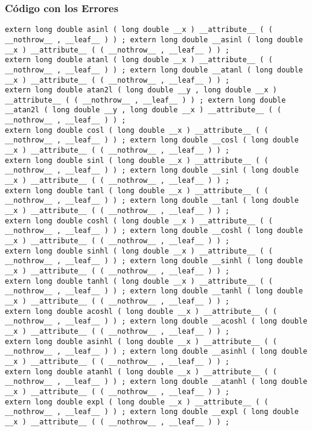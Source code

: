 \documentclass{beamer}
\begin{document}
\begin{frame}[fragile]
\frametitle{C\'odigo con los Errores}
\begin{verbatim}
extern long double asinl ( long double __x ) __attribute__ ( ( __nothrow__ , __leaf__ ) ) ; extern long double __asinl ( long double __x ) __attribute__ ( ( __nothrow__ , __leaf__ ) ) ; 
extern long double atanl ( long double __x ) __attribute__ ( ( __nothrow__ , __leaf__ ) ) ; extern long double __atanl ( long double __x ) __attribute__ ( ( __nothrow__ , __leaf__ ) ) ; 
extern long double atan2l ( long double __y , long double __x ) __attribute__ ( ( __nothrow__ , __leaf__ ) ) ; extern long double __atan2l ( long double __y , long double __x ) __attribute__ ( ( __nothrow__ , __leaf__ ) ) ; 
extern long double cosl ( long double __x ) __attribute__ ( ( __nothrow__ , __leaf__ ) ) ; extern long double __cosl ( long double __x ) __attribute__ ( ( __nothrow__ , __leaf__ ) ) ; 
extern long double sinl ( long double __x ) __attribute__ ( ( __nothrow__ , __leaf__ ) ) ; extern long double __sinl ( long double __x ) __attribute__ ( ( __nothrow__ , __leaf__ ) ) ; 
extern long double tanl ( long double __x ) __attribute__ ( ( __nothrow__ , __leaf__ ) ) ; extern long double __tanl ( long double __x ) __attribute__ ( ( __nothrow__ , __leaf__ ) ) ; 
extern long double coshl ( long double __x ) __attribute__ ( ( __nothrow__ , __leaf__ ) ) ; extern long double __coshl ( long double __x ) __attribute__ ( ( __nothrow__ , __leaf__ ) ) ; 
extern long double sinhl ( long double __x ) __attribute__ ( ( __nothrow__ , __leaf__ ) ) ; extern long double __sinhl ( long double __x ) __attribute__ ( ( __nothrow__ , __leaf__ ) ) ; 
extern long double tanhl ( long double __x ) __attribute__ ( ( __nothrow__ , __leaf__ ) ) ; extern long double __tanhl ( long double __x ) __attribute__ ( ( __nothrow__ , __leaf__ ) ) ; 
extern long double acoshl ( long double __x ) __attribute__ ( ( __nothrow__ , __leaf__ ) ) ; extern long double __acoshl ( long double __x ) __attribute__ ( ( __nothrow__ , __leaf__ ) ) ; 
extern long double asinhl ( long double __x ) __attribute__ ( ( __nothrow__ , __leaf__ ) ) ; extern long double __asinhl ( long double __x ) __attribute__ ( ( __nothrow__ , __leaf__ ) ) ; 
extern long double atanhl ( long double __x ) __attribute__ ( ( __nothrow__ , __leaf__ ) ) ; extern long double __atanhl ( long double __x ) __attribute__ ( ( __nothrow__ , __leaf__ ) ) ; 
extern long double expl ( long double __x ) __attribute__ ( ( __nothrow__ , __leaf__ ) ) ; extern long double __expl ( long double __x ) __attribute__ ( ( __nothrow__ , __leaf__ ) ) ; 
\end{verbatim}
\end{frame}
\end{document}
